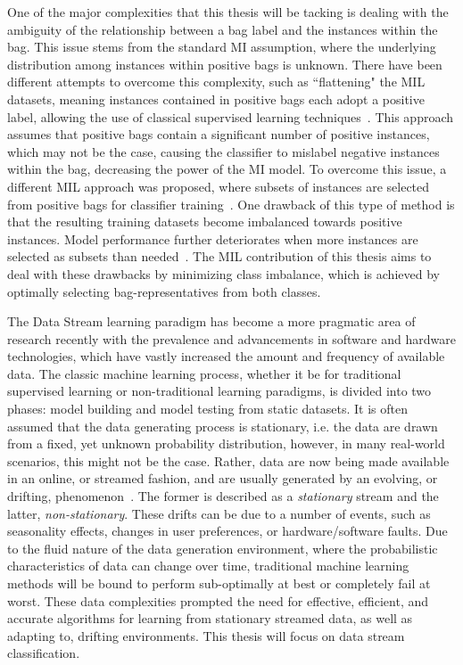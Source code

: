 \documentclass[reqno]{vcuthesis}
\numberwithin{equation}{chapter}
\begin{document}
One of the major complexities that this thesis will be tacking is dealing with the ambiguity of the relationship between a bag label and the instances within the bag. This issue stems from the standard MI assumption, where the underlying distribution among instances within positive bags is unknown. There have been different attempts to overcome this complexity, such as ``flattening" the MIL datasets, meaning instances contained in positive bags each adopt a positive label, allowing the use of classical supervised learning techniques~\cite{Ray2005}. This approach assumes that positive bags contain a significant number of positive instances, which may not be the case, causing the classifier to mislabel negative instances within the bag, decreasing the power of the MI model. To overcome this issue, a different MIL approach was proposed, where subsets of instances are selected from positive bags for classifier training~\cite{Maron1998}. One drawback of this type of method is that the resulting training datasets become imbalanced towards positive instances. Model performance further deteriorates when more instances are selected as subsets than needed~\cite{Carbonneau2016}. The MIL contribution of this thesis aims to deal with these drawbacks by minimizing class imbalance, which is achieved by optimally selecting bag-representatives from both classes.

The Data Stream learning paradigm has become a more pragmatic area of research recently with the prevalence and advancements in software and hardware technologies, which have vastly increased the amount and frequency of available data. The classic machine learning process, whether it be for traditional supervised learning or non-traditional learning paradigms, is divided into two phases: model building and model testing from static datasets. It is often assumed that the data generating process is stationary, i.e. the data are drawn from a fixed, yet unknown probability distribution, however, in many real-world scenarios, this might not be the case. Rather, data are now being made available in an online, or streamed fashion, and are usually generated by an evolving, or drifting, phenomenon~\cite{national2013frontiers,ditzler2015learning,zhou2014big}. The former is described as a \textit{stationary} stream and the latter, \textit{non-stationary}. These drifts can be due to a number of events, such as seasonality effects, changes in user preferences, or hardware/software faults. Due to the fluid nature of the data generation environment, where the probabilistic characteristics of data can change over time, traditional machine learning methods will be bound to perform sub-optimally at best or completely fail at worst. These data complexities prompted the need for effective, efficient, and accurate algorithms for learning from stationary streamed data, as well as adapting to, drifting environments. This thesis will focus on data stream classification. 
\end{document}
